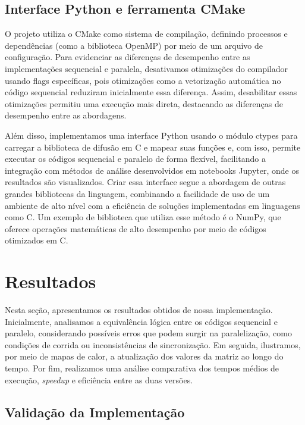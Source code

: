 \documentclass[12pt]{article}
\begin{document}
\subsection{Interface Python e ferramenta CMake}

O projeto utiliza o CMake como sistema de compilação, definindo processos e
dependências (como a biblioteca OpenMP) por meio de um arquivo de configuração.
Para evidenciar as diferenças de desempenho entre as implementações sequencial
e paralela, desativamos otimizações do compilador usando flags específicas,
pois otimizações como a vetorização automática no código sequencial reduziram
inicialmente essa diferença. Assim, desabilitar essas otimizações permitiu uma
execução mais direta, destacando as diferenças de desempenho entre as
abordagens.

Além disso, implementamos uma interface Python usando o módulo ctypes para
carregar a biblioteca de difusão em C e mapear suas funções e, com isso,
permite executar os códigos sequencial e paralelo de forma flexível,
facilitando a integração com métodos de análise desenvolvidos em notebooks
Jupyter, onde os resultados são visualizados. Criar essa interface segue a
abordagem de outras grandes bibliotecas da linguagem, combinando a facilidade
de uso de um ambiente de alto nível com a eficiência de soluções implementadas
em linguagens como C. Um exemplo de biblioteca que utiliza esse método é o
NumPy, que oferece operações matemáticas de alto desempenho por meio de códigos
otimizados em C.

\section{Resultados}

Nesta seção, apresentamos os resultados obtidos de nossa implementação.
Inicialmente, analisamos a equivalência lógica entre os códigos sequencial e
paralelo, considerando possíveis erros que podem surgir na paralelização, como
condições de corrida ou inconsistências de sincronização. Em seguida,
ilustramos, por meio de mapas de calor, a atualização dos valores da matriz ao
longo do tempo. Por fim, realizamos uma análise comparativa dos tempos médios
de execução, \textit{speedup} e eficiência entre as duas versões.

\subsection{Validação da Implementação}
\end{document}
